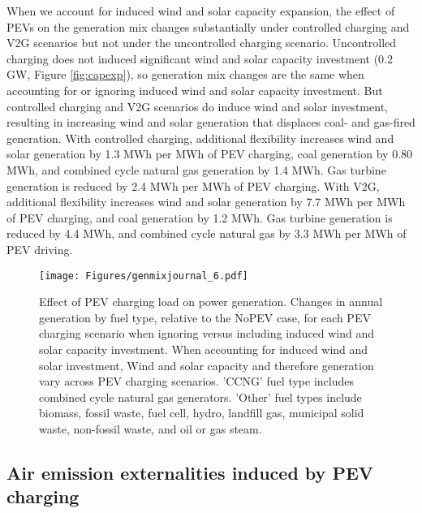 \documentclass[9pt,twocolumn,twoside,lineno]{pnas-new}
\begin{document}
When we account for induced wind and solar capacity expansion, the effect of PEVs on the generation mix changes substantially under controlled charging and V2G scenarios but not under the uncontrolled charging scenario. Uncontrolled charging does not induced significant wind and solar capacity investment (0.2 GW, Figure \ref{fig:capexp}), so generation mix changes are the same when accounting for or ignoring induced wind and solar capacity investment. But controlled charging and V2G scenarios do induce wind and solar investment, resulting in increasing wind and solar generation that displaces coal- and gas-fired generation. With controlled charging, additional flexibility increases wind and solar generation by 1.3 MWh per MWh of PEV charging, coal generation by 0.80 MWh, and combined cycle natural gas generation by 1.4 MWh. Gas turbine generation is reduced by 2.4 MWh per MWh of PEV charging. With V2G, additional flexibility increases wind and solar generation by 7.7 MWh per MWh of PEV charging, and coal generation by 1.2 MWh. Gas turbine generation is reduced by 4.4 MWh, and combined cycle natural gas by 3.3 MWh per MWh of PEV driving.

\begin{figure*}
\centering
\texttt{[image: Figures/genmixjournal\_6.pdf]}
\caption{Effect of PEV charging load on power generation. Changes in annual generation by fuel type, relative to the NoPEV case, for each PEV charging scenario when ignoring versus including induced wind and solar capacity investment. When accounting for induced wind and solar investment, Wind and solar capacity and therefore generation vary across PEV charging scenarios. 'CCNG' fuel type includes combined cycle natural gas generators. 'Other' fuel types include biomass, fossil waste, fuel cell, hydro, landfill gas, municipal solid waste, non-fossil waste, and oil or gas steam.}
\label{fig:genmix}
\end{figure*}

\subsection*{Air emission externalities induced by PEV charging}
\end{document}
